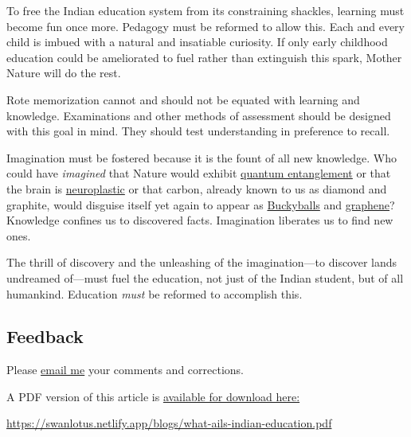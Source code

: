 \documentclass[
  a4paper,
]{article}
\begin{document}
To free the Indian education system from its constraining shackles,
learning must become fun once more. Pedagogy must be reformed to allow
this. Each and every child is imbued with a natural and insatiable
curiosity. If only early childhood education could be ameliorated to
fuel rather than extinguish this spark, Mother Nature will do the rest.

Rote memorization cannot and should not be equated with learning and
knowledge. Examinations and other methods of assessment should be
designed with this goal in mind. They should test understanding in
preference to recall.

Imagination must be fostered because it is the fount of all new
knowledge. Who could have \emph{imagined} that Nature would exhibit
\href{http://www.youtube.com/watch?v=0Eeuqh9QfNI\&list=TLlNpED2t9U9sv5MXb2p3Bdqhg2XFcWnBG}{quantum
entanglement} or that the brain is
\href{http://faculty.washington.edu/chudler/plast.html}{neuroplastic} or
that carbon, already known to us as diamond and graphite, would disguise
itself yet again to appear as
\href{http://en.wikipedia.org/wiki/Bucky_balls}{Buckyballs} and
\href{http://www.graphene.manchester.ac.uk/}{graphene}? Knowledge
confines us to discovered facts. Imagination liberates us to find new
ones.

The thrill of discovery and the unleashing of the imagination---to
discover lands undreamed of---must fuel the education, not just of the
Indian student, but of all humankind. Education \emph{must} be reformed
to accomplish this.

\hypertarget{feedback}{%
\subsection{Feedback}\label{feedback}}

Please \href{mailto:feedback.swanlotus@gmail.com}{email me} your
comments and corrections.

\noindent A PDF version of this article is
\href{./what-ails-indian-education.pdf}{available for download here:}

\begin{small}

\begin{sffamily}

\url{https://swanlotus.netlify.app/blogs/what-ails-indian-education.pdf}

\end{sffamily}

\end{small}
\end{document}
